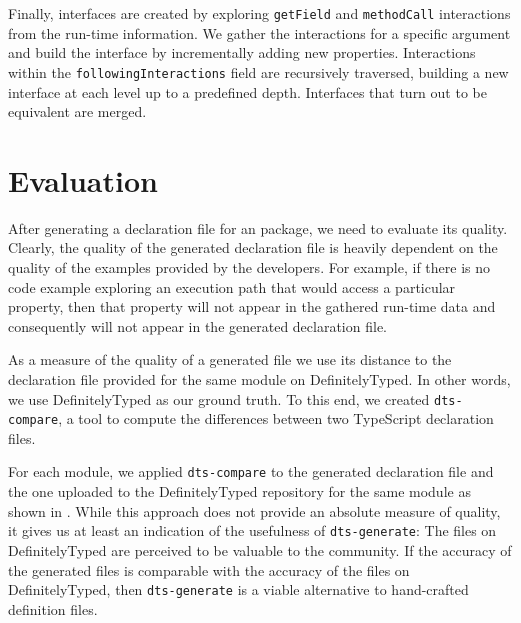 \documentclass[sigconf]{acmart}
\begin{document}
Finally, interfaces are created by exploring \texttt{getField} and \texttt{methodCall} interactions from the run-time information. We
gather the interactions for a specific argument and build the
interface by incrementally adding new properties. Interactions within
the \texttt{followingInteractions} field are recursively traversed,
building a new interface at each level up to a predefined depth. Interfaces that turn out
to be equivalent are merged.

\section{Evaluation}
\label{sec:dts-generate-evaluation}
After generating a declaration file for an \NPM{} package, we need to
evaluate its quality.
Clearly, the quality of the generated
declaration file is heavily dependent on the quality of the examples
provided by the developers. For
example, if there is no code example exploring an execution path that would
access a particular property, then that
property will not appear in the gathered run-time data and
consequently will not appear in the generated declaration file.


As a measure of the quality of a generated file we use its distance to
the declaration file provided for the same module on
DefinitelyTyped. In other words, we use DefinitelyTyped as our ground truth.
To this end, we created \texttt{dts-compare}, a tool to compute the
differences between two TypeScript declaration files.

For each module, we applied \texttt{dts-compare} to the generated declaration file and the
one uploaded to the DefinitelyTyped repository for the same module as shown in
. While this approach does not provide an absolute measure
of quality, it gives us at least an indication of the usefulness of \texttt{dts-generate}:
The files on DefinitelyTyped are perceived to be valuable to the community. If the accuracy
of the generated files is comparable with the accuracy of the files on DefinitelyTyped,
then \texttt{dts-generate} is a viable alternative to hand-crafted definition files.
\end{document}
